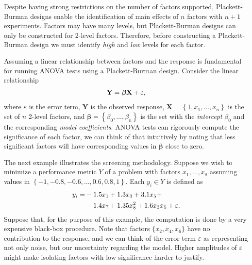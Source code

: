 \documentclass[conference]{IEEEtran}
\begin{document}
Despite  having  strong  restrictions  on   the  number  of  factors  supported,
Plackett-Burman designs enable the identification of main effects of \(n\) factors
with \(n  + 1\)  experiments. Factors  may have  many levels,  but Plackett-Burman
designs  can  only  be  constructed   for  2-level  factors.  Therefore,  before
constructing a Plackett-Burman  design we must identify \emph{high} and  \emph{low} levels for
each factor.

Assuming a linear  relationship between factors and the  response is fundamental
for  running ANOVA  tests using  a Plackett-Burman  design. Consider  the linear
relationship
\vspace{-2pt}
\begin{equation}
\mathbf{Y} = \bm{\beta}\mathbf{X} + \varepsilon\text{,}
\label{eq:linear_assumption}
\vspace{-2pt}
\end{equation}\noindent
where \(\varepsilon\) is the error term,  \(\mathbf{Y}\) is the observed response, \(\mathbf{X}
=  \left\{1,  x_1,\dots,x_n\right\}\)  is  the  set of  \(n\)  2-level  factors,  and
\(\bm{\beta} = \left\{\beta_0,\dots,\beta_n\right\}\) is the set with the \emph{intercept} \(\beta_0\)
and the corresponding \emph{model coefficients}. ANOVA tests can rigorously compute the
significance of  each factor, we  can think of  that intuitively by  noting that
less significant  factors will  have corresponding values  in \(\bm{\beta}\)  close to
zero.

The  next example  illustrates the  screening  methodology. Suppose  we wish  to
minimize  a performance  metric  \(Y\)  of a  problem  with factors  \(x_1,\dots,x_8\)
assuming values in \(\left\{-1, -0.8, -0.6, \dots, 0.6, 0.8, 1\right\}\). Each \(y_i \in
Y\) is defined as
\vspace{-2pt}
\begin{align}
\label{eq:real_model}
y_i = & -1.5x_1 + 1.3x_3 + 3.1x_5 + \\
& -1.4x_7 + 1.35x_8^2 + 1.6x_3x_5 + \varepsilon\text{.} \nonumber
\vspace{-2pt}
\end{align}\noindent
Suppose that, for the purpose of this example, the computation is done by a very
expensive  black-box  procedure.  Note   that  factors  \(\{x_2,x_4,x_6\}\)  have  no
contribution  to the  response,  and we  can  think  of the  error  term \(\varepsilon\)  as
representing not  only noise,  but our uncertainty  regarding the  model. Higher
amplitudes of \(\varepsilon\)  might make isolating factors with low  significance harder to
justify.
\end{document}
